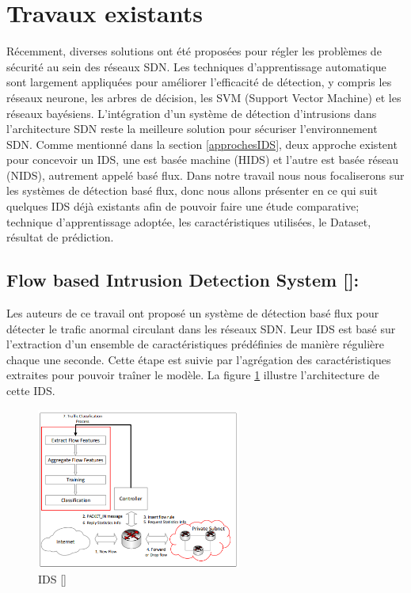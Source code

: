 \section{Travaux existants}
Récemment, diverses solutions ont été proposées pour régler les problèmes de sécurité au sein des réseaux SDN. Les techniques d’apprentissage automatique sont largement appliquées pour améliorer l’efficacité de détection, y compris les réseaux neurone, les arbres de décision, les SVM (Support Vector Machine) et les réseaux bayésiens. L'intégration d'un système de détection d'intrusions dans l'architecture SDN reste la meilleure solution pour sécuriser l'environnement SDN. Comme mentionné dans la section \ref{approchesIDS}, deux approche existent pour concevoir un IDS, une est basée machine (HIDS) et l'autre est basée réseau (NIDS), autrement appelé basé flux. Dans notre travail nous nous focaliserons sur les systèmes de détection basé flux, donc nous allons présenter en ce qui suit quelques IDS déjà existants afin de pouvoir faire une étude comparative; technique d'apprentissage adoptée, les caractéristiques utilisées, le Dataset, résultat de prédiction.\\

\subsection{Flow based Intrusion Detection System [\cite{8}]:}
Les auteurs de ce travail ont proposé un système de détection basé flux pour détecter le trafic anormal circulant dans les réseaux SDN. Leur IDS est basé sur l’extraction d’un ensemble de caractéristiques prédéfinies de manière régulière chaque une seconde. Cette étape est suivie par l’agrégation des caractéristiques extraites pour pouvoir traîner le modèle. La figure \ref{fig:NIDS1} illustre l'architecture de cette IDS.
\begin{figure}[h]
\centering
\includegraphics[width=0.6\textwidth]{Figures/NIDS1}
\decoRule
\caption{IDS [\cite{8}]}
\label{fig:NIDS1}
\end{figure}
\newpage
